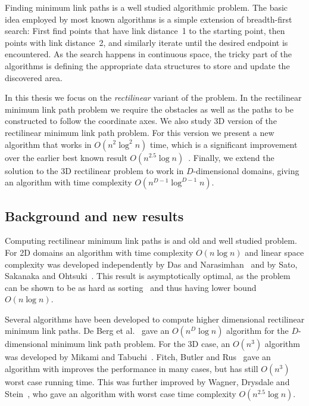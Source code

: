 \documentclass[english,gradu]{tktltiki2018}
\begin{document}
Finding minimum link paths is a well studied algorithmic problem\cite{restricted,wagner,dasnar,de1991,de1992,fitch,handbook}.
The basic idea employed by most known algorithms is a simple extension of breadth-first search:
First find points that have link distance~1 to the starting point, then points with link distance~2, and similarly iterate until the desired endpoint is encountered.
As the search happens in continuous space, the tricky part of the algorithms is defining the appropriate data structures to store and update the discovered area.

In this thesis we focus on the \emph{rectilinear} variant of the problem.
In the rectilinear minimum link path problem we require the obstacles as well as the paths to be constructed to follow the coordinate axes.
We also study 3D version of the rectilinear minimum link path problem.
For this version we present a new algorithm that works in $O(n^2\log^2n)$ time, which is a significant improvement over the earlier best known result $O(n^{2.5}\log n)$~\cite{restricted}.
Finally, we extend the solution to the 3D rectilinear problem to work in $D$-dimensional domains, giving an algorithm with time complexity $O(n^{D-1}\log^{D-1}n)$.

\subsection{Background and new results}

Computing rectilinear minimum link paths is and old and well studied problem.
For 2D domains an algorithm with time complexity $O(n\log n)$ and linear space complexity was developed independently by Das and Narasimhan~\cite{dasnar} and by Sato, Sakanaka and Ohtsuki~\cite{sato}.
This result is asymptotically optimal, as the problem can be shown to be as hard as sorting~\cite{dasnar} and thus having lower bound $O(n\log n)$.

Several algorithms have been developed to compute higher dimensional rectilinear minimum link paths.
De Berg et al.~\cite{de1992} gave an $O(n^D\log n)$ algorithm for the $D$-dimensional minimum link path problem.
For the 3D case, an $O(n^3)$ algorithm was developed by Mikami and Tabuchi~\cite{mikami}.
Fitch, Butler and Rus~\cite{fitch} gave an algorithm with improves the performance in many cases, but has still $O(n^3)$ worst case running time.
This was further improved by Wagner, Drysdale and Stein~\cite{wagner}, who gave an algorithm with worst case time complexity $O(n^{2.5}\log n)$.
\end{document}
